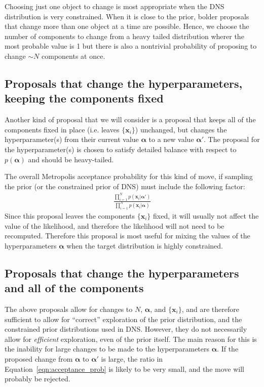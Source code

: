 \documentclass[letterpaper, 11pt]{article}
\newcommand{\hyperparams}{\boldsymbol{\alpha}}
\newcommand{\xx}{\mathbf{x}}
\begin{document}
Choosing just one object to change is most appropriate when the DNS
distribution is very constrained. When it is close to the prior, bolder
proposals that change more than one object at a time are possible. Hence,
we choose the number of components to change from a heavy tailed distribution
wherer the most probable value is 1 but there is also a nontrivial probability
of proposing to change $\sim N$ components at once.

\subsection{Proposals that change the hyperparameters,
keeping the components fixed}\label{sec:proposal3}
Another kind of proposal that we will consider is a proposal that keeps all of
the components fixed in place (i.e. leaves $\{\xx_i\}$) unchanged, but changes
the hyperparameter(s) from their current value $\hyperparams$
to a new value $\hyperparams'$. The proposal for the hyperparameter(s) is chosen
to satisfy detailed balance with respect to $p(\hyperparams)$ and should be
heavy-tailed.

The overall Metropolis acceptance probability
for this kind of move, if sampling the prior (or the constrained prior of DNS)
must include the following factor:
\begin{eqnarray}
\frac{\prod_{i=1}^N p(\xx_i | \hyperparams')}{\prod_{i=1}^N p(\xx_i | \hyperparams)}
\label{eqn:acceptance_prob}
\end{eqnarray}
Since this proposal leaves the components $\{\xx_i\}$ fixed, it will usually not
affect the value of the likelihood, and therefore the likelihood will not need
to be recomputed. Therefore this proposal is most useful for mixing the values
of the hyperparameters $\hyperparams$ when the target distribution is highly
constrained.

\subsection{Proposals that change the hyperparameters
and all of the components}\label{sec:proposal4}
The above proposals allow for changes to $N$, $\hyperparams$, and $\{\xx_i\}$,
and are therefore sufficient to allow for ``correct'' exploration of the
prior distribution, and the constrained prior distributions used in DNS.
However, they do not necessarily allow for {\it efficient} exploration, even
of the prior itself. The main reason for this is the inability for large
changes to be made to the hyperparameters $\hyperparams$. If the proposed change
from $\hyperparams$ to $\hyperparams'$ is large, the ratio in
Equation~\ref{eqn:acceptance_prob} is likely to be very small, and the move
will probably be rejected.
\end{document}
